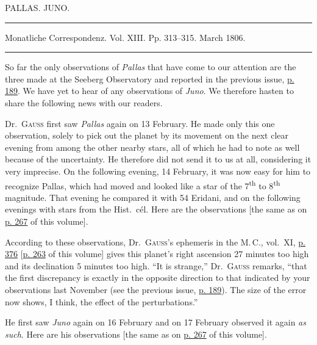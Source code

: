 \clearpage
{}
\hypertarget{native-274-lower}{}
\begin{center}
PALLAS. JUNO.

\rule{0.6\linewidth}{0.4pt}

Monatliche Correspondenz. Vol. XIII. Pp. 313–315. March 1806.

\rule{0.6\linewidth}{0.4pt}
\end{center}

\par\indent So far the only observations of \emph{Pallas} that have come to our attention are the three made at the Seeberg Observatory and reported in the previous issue, \href{https://www.digitale-sammlungen.de/en/view/bsb10538605?page=197}{p. 189}. We have yet to hear of any observations of \emph{Juno}. We therefore hasten to share the following news with our readers.

\par\indent Dr.\ \textsc{Gauss} first saw \emph{Pallas} again on 13 February. He made only this one observation, solely to pick out the planet by its movement on the next clear evening from among the other nearby stars, all of which he had to note as well because of the uncertainty. He therefore did not send it to us at all, considering it very imprecise. On the following evening, 14 February, it was now easy for him to recognize Pallas, which had moved and looked like a star of the 7\textsuperscript{th} to 8\textsuperscript{th} magnitude. That evening he compared it with 54 Eridani, and on the following evenings with stars from the Hist.\ cél. Here are the observations [the same as on \hyperlink{native-272}{p. 267} of this volume].

\par\indent According to these observations, Dr.\ \textsc{Gauss}’s ephemeris in the M.\,C., vol.\ XI, \href{https://www.digitale-sammlungen.de/en/view/bsb10538603?page=388}{p. 376} [\hyperlink{pallas180504.1}{p. 263} of this volume] gives this planet’s right ascension 27 minutes too high and its declination 5 minutes too high. “It is strange,” Dr.\ \textsc{Gauss} remarks, “that the first discrepancy is exactly in the opposite direction to that indicated by your observations last November (see the previous issue, \href{https://www.digitale-sammlungen.de/en/view/bsb10538605?page=197}{p. 189}). The size of the error now shows, I think, the effect of the perturbations.”

\par\indent He first saw \emph{Juno} again on 16 February and on 17 February observed it again \emph{as such}. Here are his observations [the same as on \hyperlink{native-272}{p. 267} of this volume].

